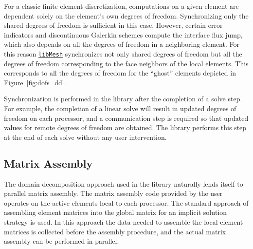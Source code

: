 \documentclass[global,twocolumn,final]{svjour}
\newcommand{\libMesh}{\href{http://libmesh.sourceforge.net}{\texttt{lib\-Mesh}}}
\begin{document}
For a classic finite element discretization, computations on a given
element are dependent solely on the element's own degrees of freedom.  
Synchronizing only the shared degrees of freedom is sufficient in this
case.  However, certain error indicators and discontinuous Galerkin
schemes compute the interface flux jump, which also depends on all the
degrees of freedom in a neighboring element.  For this reason
\libMesh{}
synchronizes not only shared degrees of freedom but all the
degrees of freedom corresponding to the face neighbors of the local
elements.  This corresponds to all the degrees of freedom for the
``ghost'' elements depicted in Figure~\ref{fig:dofs_dd}.

Synchronization is performed in the library after the completion of a
solve step.  For example, the completion of a linear solve will result
in updated degrees of freedom on each processor, and a communication
step is required so that updated values for remote degrees of freedom
are obtained.  The library performs this step at the end of each solve
without any user intervention.

\subsection{Matrix Assembly}
The domain decomposition approach used in the library naturally lends
itself to parallel matrix assembly. The matrix assembly code provided
by the user operates on the active elements local to each
processor.  The standard approach of assembling element matrices into
the global matrix for an implicit solution strategy is used.  In this
approach the data needed to assemble the local element matrices is
collected before the assembly procedure, and the actual matrix
assembly can be performed in parallel.
\end{document}
